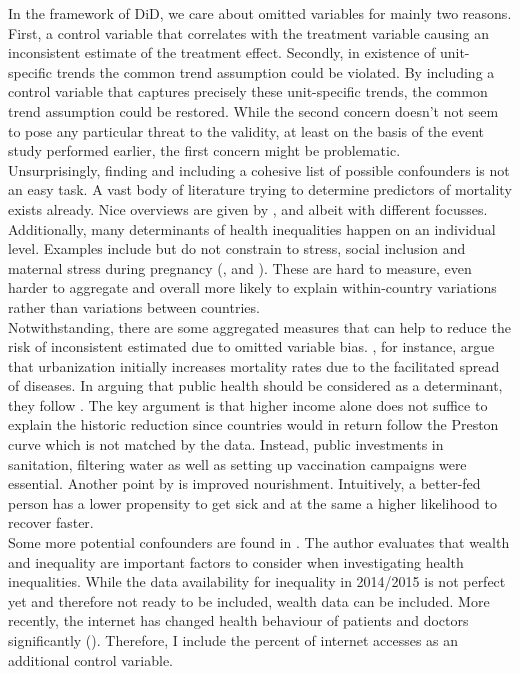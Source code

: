 \documentclass{article}
\begin{document}
In the framework of DiD, we care about omitted variables for mainly two reasons. First, a control variable that correlates with the treatment variable causing an inconsistent estimate of the treatment effect. Secondly, in existence of unit-specific trends the common trend assumption could be violated. By including a control variable that captures precisely these unit-specific trends, the common trend assumption could be restored. While the second concern doesn't not seem to pose any particular threat to the validity, at least on the basis of the event study performed earlier, the first concern might be problematic.\\
Unsurprisingly, finding and including a cohesive list of possible confounders is not an easy task. A vast body of literature trying to determine predictors of mortality exists already. Nice overviews are given by \cite{cutler2006determinants}, \cite{soares2007determinants} and \cite{arcaya2015inequalities} albeit with different focusses. Additionally, many determinants of health inequalities happen on an individual level. Examples include but do not constrain to stress, social inclusion and 
maternal stress during pregnancy (\cite{thoits2010stress}, \cite{cohen2004social} and \cite{almond2011killing}). These are hard to measure, even harder to aggregate and overall more likely to explain within-country variations rather than variations between countries. \\
Notwithstanding, there are some aggregated measures that can help to reduce the risk of inconsistent estimated due to omitted variable bias. \cite{cutler2006determinants}, for instance, argue that urbanization initially increases mortality rates due to the facilitated spread of diseases. In arguing that public health should be considered as a determinant, they follow \cite{preston1975changing}. The key argument is that higher income alone does not suffice to explain the historic reduction since countries would in return follow the Preston curve which is not matched by the data. Instead, public investments in sanitation, filtering water as well as setting up vaccination campaigns were essential. Another point by \cite{cutler2006determinants} is improved nourishment. Intuitively, a better-fed person has a lower propensity to get sick and at the same a higher likelihood to recover faster.\\
Some more potential confounders are found in \cite{marmot2005social}. The author evaluates that wealth and inequality are important factors to consider when investigating health inequalities. While the data availability for inequality in 2014/2015 is not perfect yet and therefore not ready to be included, wealth data can be included. More recently, the internet has changed health behaviour of patients and doctors significantly (\cite{cook2008internet}). Therefore, I include the percent of internet accesses as an additional control variable.\\
\end{document}
